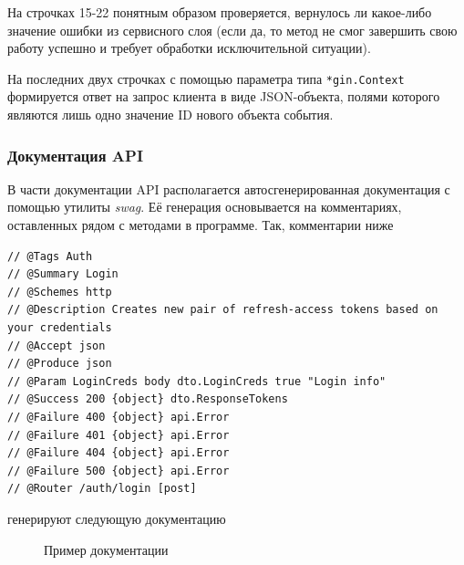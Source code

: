 \documentclass[diploma]{SCWorks}
\begin{document}
На строчках 15-22 понятным образом проверяется, вернулось ли какое-либо
значение ошибки из сервисного слоя (если да, то метод не смог завершить свою 
работу успешно и требует обработки исключительной ситуации).

На последних двух строчках с помощью параметра типа \texttt{*gin.Context} 
формируется ответ на запрос клиента в виде JSON-объекта, полями которого 
являются лишь одно значение ID нового объекта события.

\subsubsection{Документация API}

В части документации API располагается автосгенерированная документация с 
помощью утилиты \textit{swag}. Её генерация основывается на комментариях, 
оставленных рядом с методами в программе. Так, комментарии ниже
\begin{verbatim}
// @Tags Auth
// @Summary Login
// @Schemes http
// @Description Creates new pair of refresh-access tokens based on your credentials
// @Accept json
// @Produce json
// @Param LoginCreds body dto.LoginCreds true "Login info"
// @Success 200 {object} dto.ResponseTokens
// @Failure 400 {object} api.Error
// @Failure 401 {object} api.Error
// @Failure 404 {object} api.Error
// @Failure 500 {object} api.Error
// @Router /auth/login [post]
\end{verbatim}
генерируют следующую документацию
\begin{figure}[H]
	\caption{Пример документации}
	\label{pic:doc_example}
\end{figure}
\end{document}
